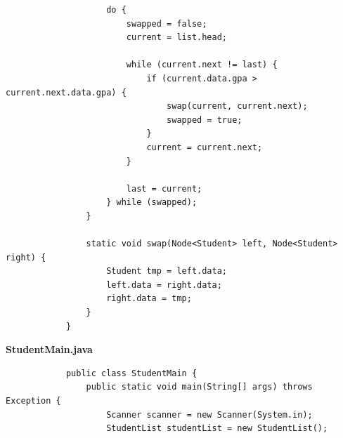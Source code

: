 \documentclass[12pt,titlepage]{article}
\begin{document}
\begin{enumerate}
{\begin{verbatim}
                    do {
                        swapped = false;
                        current = list.head;

                        while (current.next != last) {
                            if (current.data.gpa > current.next.data.gpa) {
                                swap(current, current.next);
                                swapped = true;
                            }
                            current = current.next;
                        }

                        last = current;
                    } while (swapped);
                }

                static void swap(Node<Student> left, Node<Student> right) {
                    Student tmp = left.data;
                    left.data = right.data;
                    right.data = tmp;
                }
            }
        \end{verbatim}

        \large{\textbf{StudentMain.java}}
        \begin{verbatim}
            public class StudentMain {
                public static void main(String[] args) throws Exception {
                    Scanner scanner = new Scanner(System.in);
                    StudentList studentList = new StudentList();


\end{verbatim}}
\end{enumerate}
\end{document}
